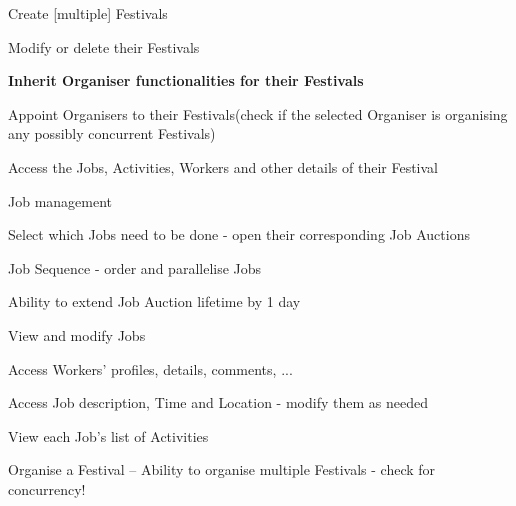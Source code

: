 \begin{packed_enum}
\begin{packed_enum}
				\end{packed_enum}
				
				\item	{}
				\begin{packed_enum}
					\item Create [multiple] Festivals
					\item Modify or delete their Festivals	
					\item \textbf{Inherit Organiser functionalities for their Festivals}
					\item Appoint Organisers to their Festivals(check if the selected Organiser is organising any possibly concurrent Festivals)
					\item Access the Jobs, Activities, Workers and other details of their Festival
				\end{packed_enum}
				
				\item	{}
				\begin{packed_enum}
					\item Job management
					\begin{packed_enum}
						\item Select which Jobs need to be done - open their corresponding Job Auctions
						\item Job Sequence - order and parallelise Jobs
						\item Ability to extend Job Auction lifetime by 1 day
						\item View and modify Jobs
						\begin{packed_enum}
							\item Access Workers' profiles, details, comments, ...
							\item Access Job description, Time and Location - modify them as needed
							\item View each Job's list of Activities
						\end{packed_enum}
					\end{packed_enum}
					
					\item Organise a Festival -- Ability to organise multiple Festivals - check for concurrency!
				\end{packed_enum}
				

\end{packed_enum}
